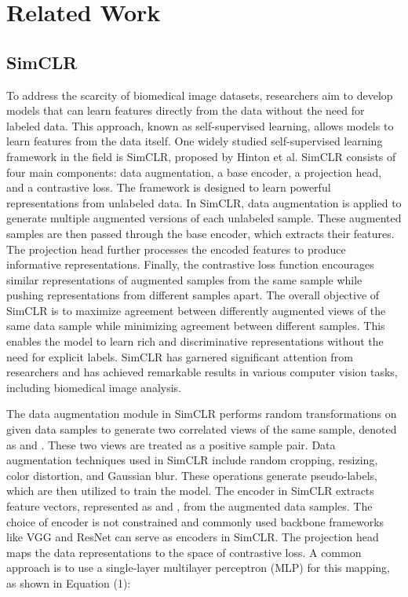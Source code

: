 \documentclass[10pt,twocolumn,letterpaper]{article}
\begin{document}
\section{Related Work}
\label{sec:related work}

\subsection{SimCLR}

To address the scarcity of biomedical image datasets, researchers aim to develop models that can learn features directly from the data without the need for labeled data. This approach, known as self-supervised learning, allows models to learn features from the data itself. One widely studied self-supervised learning framework in the field is SimCLR, proposed by Hinton et al.
SimCLR consists of four main components: data augmentation, a base encoder, a projection head, and a contrastive loss. The framework is designed to learn powerful representations from unlabeled data. In SimCLR, data augmentation is applied to generate multiple augmented versions of each unlabeled sample. These augmented samples are then passed through the base encoder, which extracts their features. The projection head further processes the encoded features to produce informative representations. Finally, the contrastive loss function encourages similar representations of augmented samples from the same sample while pushing representations from different samples apart.
The overall objective of SimCLR is to maximize agreement between differently augmented views of the same data sample while minimizing agreement between different samples. This enables the model to learn rich and discriminative representations without the need for explicit labels. SimCLR has garnered significant attention from researchers and has achieved remarkable results in various computer vision tasks, including biomedical image analysis.

The data augmentation module in SimCLR performs random transformations on given data samples to generate two correlated views of the same sample, denoted as  and . These two views are treated as a positive sample pair. Data augmentation techniques used in SimCLR include random cropping, resizing, color distortion, and Gaussian blur. These operations generate pseudo-labels, which are then utilized to train the model.
The encoder in SimCLR extracts feature vectors, represented as  and , from the augmented data samples. The choice of encoder is not constrained and commonly used backbone frameworks like VGG and ResNet can serve as encoders in SimCLR.
The projection head maps the data representations to the space of contrastive loss. A common approach is to use a single-layer multilayer perceptron (MLP) for this mapping, as shown in Equation (1):
\end{document}
